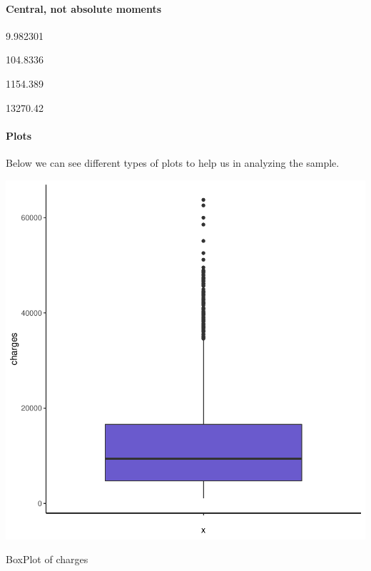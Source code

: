 \documentclass{article}
\begin{document}
\paragraph{ Central, not absolute moments \newline} 
\begin{Schunk}
\begin{Soutput}
[1] 9.982301
\end{Soutput}
\begin{Soutput}
[1] 104.8336
\end{Soutput}
\begin{Soutput}
[1] 1154.389
\end{Soutput}
\begin{Soutput}
[1] 13270.42
\end{Soutput}
\end{Schunk}

\paragraph{Plots \newline} 
Below we can see different types of plots to help us in analyzing the sample.

\begin{centerfig}
\includegraphics{Untitled-031}
\caption{BoxPlot of charges}
\end{centerfig}
\end{document}
